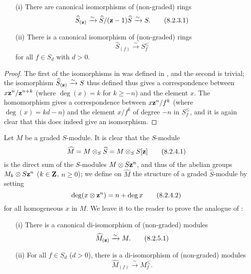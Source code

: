 \begin{lemma}[8.2.3]
\label{2.8.2.3}
\begin{enumerate}
  \item[\rm{(i)}] There are canonical isomorphisms of (non-graded) rings
    \[
    \label{eq:2.8.2.3.1}
      \widehat{S}_{(\mathbf{z})}
      \xrightarrow{\sim}
      \widehat{S}/(\mathbf{z}-1)\widehat{S}
      \xrightarrow{\sim}
      S.
    \tag{8.2.3.1}
    \]
  \item[\rm{(ii)}] There is a canonical isomorphism of (non-graded) rings
    \[
    \label{eq:2.8.2.3.2}
      \widehat{S}_{(f)} \xrightarrow{\sim} S_f^\leq
    \tag{8.2.3.2}
    \]
    for all $f\in S_d$ with $d>0$.
\end{enumerate}
\end{lemma}

\begin{proof}
\label{proof-2.8.2.3}
The first of the isomorphisms in  was defined in , and the second is trivial;
the isomorphism $\widehat{S}_{(\mathbf{z})} \xrightarrow{\sim} S$ thus defined thus gives a correspondence between $x\mathbf{z}^n/\mathbf{z}^{n+k}$ (where $\deg(x) = k$ for $k\geq -n$) and the element $x$.
The homomorphism  gives a correspondence between $x\mathbf{z}^n/f^k$ (where $\deg(x) = kd-n$) and the element $x/f^k$ of degree $-n$ in $S_f^\leq$, and it is again clear that this does indeed give an isomorphism.
\end{proof}

\begin{env}[8.2.4]
\label{2.8.2.4}
Let $M$ be a graded $S$-module.
It is clear that the $S$-module
\[
\label{eq:2.8.2.4.1}
  \widehat{M} = M \otimes_S \widehat{S} = M \otimes_S S[\mathbf{z}]
\tag{8.2.4.1}
\]
is the direct sum of the $S$-modules $M\otimes S\mathbf{z}^n$, and thus of the abelian groups $M_k\otimes S\mathbf{z}^n$ ($k\in\mathbf{Z}$, $n\geq0$);
we define on $\widehat{M}$ the structure of a graded $\widehat{S}$-module by setting
\[
\label{eq:2.8.2.4.2}
  \deg(x\otimes\mathbf{z}^n) = n+\deg x
\tag{8.2.4.2}
\]
for all homogeneous $x$ in $M$.
We leave it to the reader to prove the analogue of :
\end{env}

\begin{lemma}[8.2.5]
\label{2.8.2.5}
\begin{enumerate}
  \item[\rm{(i)}] There is a canonical di-isomorphism of (non-graded) modules
    \[
    \label{eq:2.8.2.5.1}
      \widehat{M}_{(\mathbf{z})} \xrightarrow{\sim} M.
    \tag{8.2.5.1}
    \]
  \item[\rm{(ii)}] For all $f\in S_d$ ($d>0$), there is a di-isomorphism of (non-graded) modules
    \[
    \label{eq:2.8.2.5.2}
      \widehat{M}_{(f)} \xrightarrow{\sim} M_f^\leq.
    \tag{8.2.5.2}
    \]
\end{enumerate}
\end{lemma}

